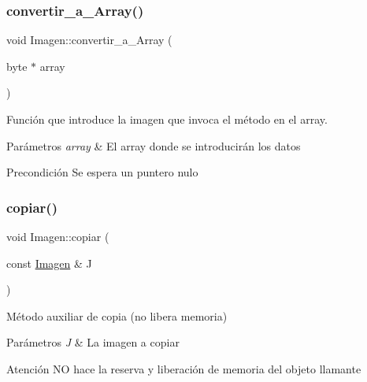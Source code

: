 \subsubsection{\texorpdfstring{convertir\+\_\+a\+\_\+\+Array()}{convertir\_a\_Array()}}
{\footnotesize\ttfamily void Imagen\+::convertir\+\_\+a\+\_\+\+Array (\begin{DoxyParamCaption}\item[{byte $\ast$}]{array }\end{DoxyParamCaption})}



Función que introduce la imagen que invoca el método en el array. 


\begin{DoxyParams}{Parámetros}
{\em array} & El array donde se introducirán los datos \\
\hline
\end{DoxyParams}
\begin{DoxyPrecond}{Precondición}
Se espera un puntero nulo 
\end{DoxyPrecond}
\mbox{\label{classImagen_a413866cbb4ddb48f512877e75a73eba3}} 
\subsubsection{\texorpdfstring{copiar()}{copiar()}}
{\footnotesize\ttfamily void Imagen\+::copiar (\begin{DoxyParamCaption}\item[{const \hyperlink{classImagen}{Imagen} \&}]{J }\end{DoxyParamCaption})\hspace{0.3cm}{\ttfamily [private]}}



Método auxiliar de copia (no libera memoria) 


\begin{DoxyParams}{Parámetros}
{\em J} & La imagen a copiar \\
\hline
\end{DoxyParams}
\begin{DoxyWarning}{Atención}
NO hace la reserva y liberación de memoria del objeto llamante 
\end{DoxyWarning}
\mbox{\label{classImagen_ac28d55c18064aea2a65e6fcf51d86191}} 
